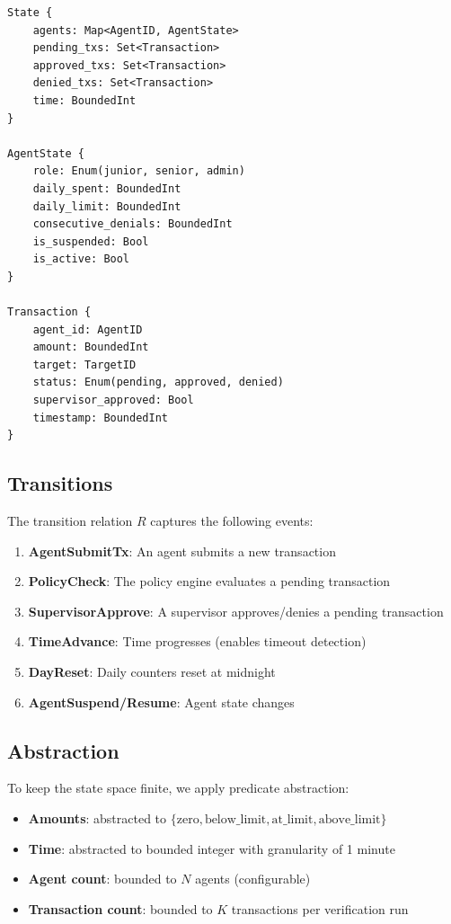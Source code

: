 \documentclass{llncs}
\begin{document}
\begin{lstlisting}[basicstyle=\ttfamily\small, frame=single]
State {
    agents: Map<AgentID, AgentState>
    pending_txs: Set<Transaction>
    approved_txs: Set<Transaction>
    denied_txs: Set<Transaction>
    time: BoundedInt
}

AgentState {
    role: Enum(junior, senior, admin)
    daily_spent: BoundedInt
    daily_limit: BoundedInt
    consecutive_denials: BoundedInt
    is_suspended: Bool
    is_active: Bool
}

Transaction {
    agent_id: AgentID
    amount: BoundedInt
    target: TargetID
    status: Enum(pending, approved, denied)
    supervisor_approved: Bool
    timestamp: BoundedInt
}
\end{lstlisting}

\subsection{Transitions}

The transition relation $R$ captures the following events:
\begin{enumerate}
    \item \textbf{AgentSubmitTx}: An agent submits a new transaction
    \item \textbf{PolicyCheck}: The policy engine evaluates a pending transaction
    \item \textbf{SupervisorApprove}: A supervisor approves/denies a pending transaction
    \item \textbf{TimeAdvance}: Time progresses (enables timeout detection)
    \item \textbf{DayReset}: Daily counters reset at midnight
    \item \textbf{AgentSuspend/Resume}: Agent state changes
\end{enumerate}

\subsection{Abstraction}

To keep the state space finite, we apply predicate abstraction:
\begin{itemize}
    \item \textbf{Amounts}: abstracted to $\{\text{zero}, \text{below\_limit}, \text{at\_limit}, \text{above\_limit}\}$
    \item \textbf{Time}: abstracted to bounded integer with granularity of 1 minute
    \item \textbf{Agent count}: bounded to $N$ agents (configurable)
    \item \textbf{Transaction count}: bounded to $K$ transactions per verification run
\end{itemize}
\end{document}
